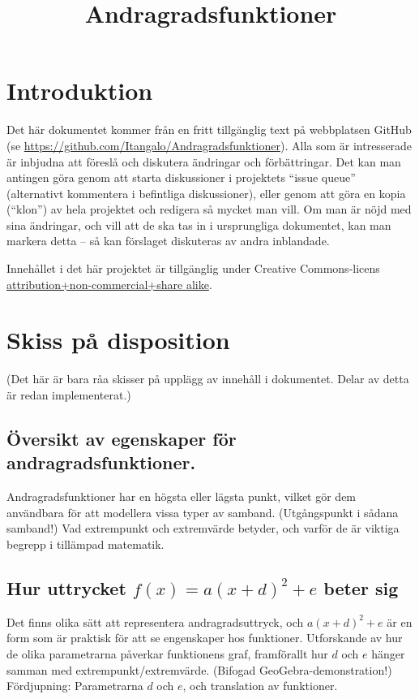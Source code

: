 \documentclass[12pt]{article}
\title{Andragradsfunktioner}
\date{}
\begin{document}
  \maketitle
  
  
  
  \section{Introduktion}
  Det här dokumentet kommer från en fritt tillgänglig text på webbplatsen GitHub (se \url{https://github.com/Itangalo/Andragradsfunktioner}).
  Alla som är intresserade är inbjudna att föreslå och diskutera ändringar och förbättringar.
  Det kan man antingen göra genom att starta diskussioner i projektets ``issue queue'' (alternativt kommentera i befintliga diskussioner), eller genom att göra en kopia (``klon'') av hela projektet och redigera så mycket man vill.
  Om man är nöjd med sina ändringar, och vill att de ska tas in i ursprungliga dokumentet, kan man markera detta -- så kan förslaget diskuteras av andra inblandade.

  Innehållet i det här projektet är tillgänglig under Creative Commons-licens \href{http://creativecommons.org/licenses/by-nc-sa/3.0/}{attribution+non-commercial+share alike}.

  
  
  

  

  
  
  \section{Skiss på disposition}
  
  (Det här är bara råa skisser på upplägg av innehåll i dokumentet. Delar av detta är redan implementerat.)

  \subsection{Översikt av egenskaper för andragradsfunktioner.}
  Andragradsfunktioner har en högsta eller lägsta punkt, vilket gör dem användbara för att modellera vissa typer av samband.
  (Utgångspunkt i sådana samband!)
  Vad extrempunkt och extremvärde betyder, och varför de är viktiga begrepp i tillämpad matematik.

  \subsection{Hur uttrycket $f(x) = a(x+d)^2+e$ beter sig}
  Det finns olika sätt att representera andragradsuttryck, och $a(x+d)^2+e$ är en form som är praktisk för att se engenskaper hos funktioner.
  Utforskande av hur de olika parametrarna påverkar funktionens graf, framförallt hur $d$ och $e$ hänger samman med extrempunkt/extremvärde.
  (Bifogad GeoGebra-demonstration!)
  Fördjupning: Parametrarna $d$ och $e$, och translation av funktioner.
  
\end{document}
